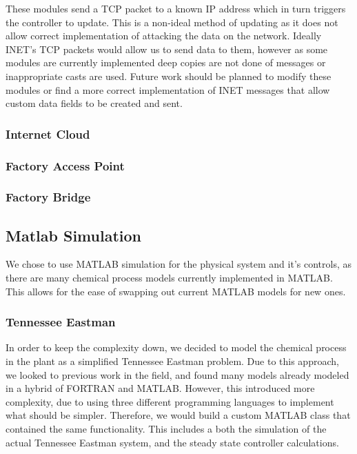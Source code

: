 These modules send a TCP packet to a known IP address which in turn triggers the controller to update. This is a non-ideal method of updating as it does not allow correct implementation of attacking the data on the network. Ideally INET's TCP packets would allow us to send data to them, however as some modules are currently implemented deep copies are not done of messages or inappropriate casts are used. Future work should be planned to modify these modules or find a more correct
implementation of INET messages that allow custom data fields to be created and sent. 

\subsubsection{Internet Cloud}

\subsubsection{Factory Access Point}

\subsubsection{Factory Bridge}

\subsection{Matlab Simulation}
 We chose to use MATLAB simulation for the physical system and it's controls, as there are many chemical process models currently implemented in MATLAB. This allows for the ease of swapping out current MATLAB models for new ones.

\subsubsection{Tennessee Eastman}
 In order to keep the complexity down, we decided to model the chemical process in the plant as a simplified Tennessee Eastman problem. Due to this approach, we looked to previous work in the field, and found many models already modeled in a hybrid of FORTRAN and MATLAB.  However, this introduced more complexity, due to using three different programming languages to implement what should be simpler.  Therefore, we would build a custom MATLAB class that contained the same functionality.  This includes a both the simulation of the actual Tennessee Eastman system, and the steady state controller calculations.


